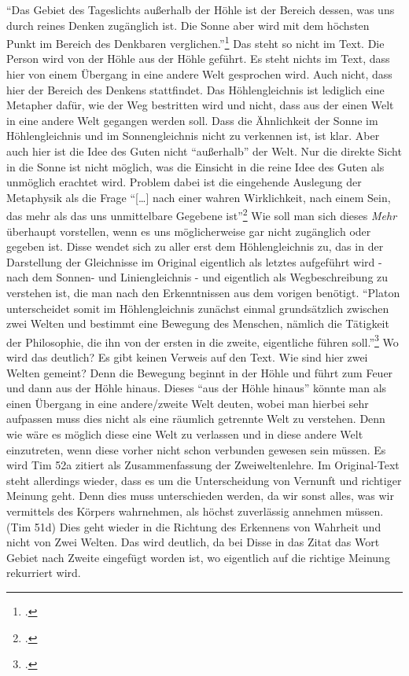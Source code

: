 \enquote{Das Gebiet des Tageslichts außerhalb der Höhle ist der Bereich dessen, was uns durch reines Denken zugänglich ist. Die Sonne aber wird mit dem höchsten Punkt im Bereich des Denkbaren verglichen.}\footcite[][S. 49]{DisseMetaphysik} Das steht so nicht im Text. Die Person wird von der Höhle aus der Höhle geführt. Es steht nichts im Text, dass hier von einem Übergang in eine andere Welt gesprochen wird. Auch nicht, dass hier der Bereich des Denkens stattfindet. Das Höhlengleichnis ist lediglich eine Metapher dafür, wie der Weg bestritten wird und nicht, dass aus der einen Welt in eine andere Welt gegangen werden soll. Dass die Ähnlichkeit der Sonne im Höhlengleichnis und im Sonnengleichnis nicht zu verkennen ist, ist klar. Aber auch hier ist die Idee des Guten nicht \enquote{außerhalb} der Welt. Nur die direkte Sicht in die Sonne ist nicht möglich, was die Einsicht in die reine Idee des Guten als unmöglich erachtet wird. 
Problem dabei ist die eingehende Auslegung der Metaphysik als die Frage \enquote{[\dots] nach einer wahren Wirklichkeit, nach einem Sein, das mehr als das uns unmittelbare Gegebene ist}\footcite[vgl.][S. 17]{DisseMetaphysik} Wie soll man sich dieses \emph{Mehr} überhaupt vorstellen, wenn es uns möglicherweise gar nicht zugänglich oder gegeben ist.
Disse wendet sich zu aller erst dem Höhlengleichnis zu, das in der Darstellung der Gleichnisse im Original eigentlich als letztes aufgeführt wird - nach dem Sonnen- und Liniengleichnis - und eigentlich als Wegbeschreibung zu verstehen ist, die man nach den Erkenntnissen aus dem vorigen benötigt. 
\enquote{Platon unterscheidet somit im Höhlengleichnis zunächst einmal grundsätzlich zwischen zwei Welten und bestimmt eine Bewegung des Menschen, nämlich die Tätigkeit der Philosophie, die ihn von der ersten in die zweite, eigentliche führen soll.}\footcite[][S. 23f.]{DisseMetaphysik} Wo wird das deutlich? Es gibt keinen Verweis auf den Text. Wie sind hier zwei Welten gemeint? Denn die Bewegung beginnt in der Höhle und führt zum Feuer und dann aus der Höhle hinaus. Dieses \enquote{aus der Höhle hinaus} könnte man als einen Übergang in eine andere/zweite Welt deuten, wobei man hierbei sehr aufpassen muss dies nicht als eine räumlich getrennte Welt zu verstehen. Denn wie wäre es möglich diese eine Welt zu verlassen und in diese andere Welt einzutreten, wenn diese vorher nicht schon verbunden gewesen sein müssen.
Es wird Tim 52a zitiert als Zusammenfassung der Zweiweltenlehre. Im Original-Text steht allerdings wieder, dass es um die Unterscheidung von Vernunft und richtiger Meinung geht. Denn dies muss unterschieden werden, da wir sonst alles, was wir vermittels des Körpers wahrnehmen, als höchst zuverlässig annehmen müssen. (Tim 51d) Dies geht wieder in die Richtung des Erkennens von Wahrheit und nicht von Zwei Welten. Das wird deutlich, da bei Disse in das Zitat das Wort Gebiet nach Zweite eingefügt worden ist, wo eigentlich auf die richtige Meinung rekurriert wird.
